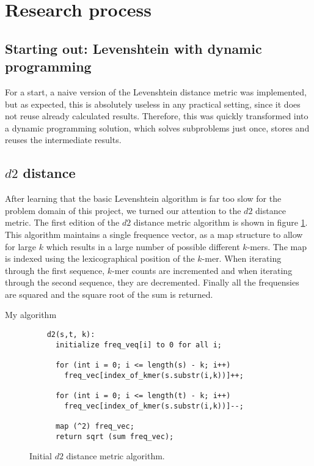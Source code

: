 \section{Research process}
\subsection{Starting out: Levenshtein with dynamic programming}
For a start, a naive version of the Levenshtein distance metric was
implemented, but as expected, this is absolutely useless in any practical
setting, since it does not reuse already calculated results. Therefore, this
was quickly transformed into a dynamic programming solution, which solves
subproblems just once, stores and reuses the intermediate results.

\subsection{$d2$ distance}
After learning that the basic Levenshtein algorithm is far too slow for the
problem domain of this project, we turned our attention to the $d2$ distance
metric. The first edition of the $d2$ distance metric algorithm is shown in
figure \ref{alg:d2}. This algorithm maintains a single frequence vector, as a
map structure to allow for large $k$ which results in a large number of
possible different $k$-mers. The map is indexed using the lexicographical
position of the $k$-mer. When iterating through the first sequence, $k$-mer
counts are incremented and when iterating through the second sequence, they are
decremented. Finally all the frequensies are squared and the square root of the
sum is returned.


\begin{algorithm}
  \caption{My algorithm}\label{alg:d2}
  \begin{algorithmic}[1]
   \EndFunction
  \end{algorithmic}
\end{algorithm}

\begin{figure}[!h]
  \centering
  \begin{verbatim}
    d2(s,t, k):
      initialize freq_veq[i] to 0 for all i;

      for (int i = 0; i <= length(s) - k; i++)
        freq_vec[index_of_kmer(s.substr(i,k))]++;

      for (int i = 0; i <= length(t) - k; i++)
        freq_vec[index_of_kmer(s.substr(i,k))]--;

      map (^2) freq_vec;
      return sqrt (sum freq_vec);
  \end{verbatim}
  \caption{Initial $d2$ distance metric algorithm.}
  \label{alg:d2}
\end{figure}
